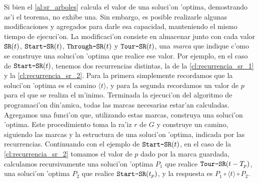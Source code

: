 Si bien el \autoref{al:sr_arboles} calcula el valor de una soluci'on 'optima, demostrando as'i el teorema, no exhibe una. Sin embargo, es posible realizarle algunas modificaciones y agregados para darle esa capacidad, manteniendo el mismo tiempo de ejecuci'on. La modificaci'on consiste en almacenar junto con cada valor $\texttt{SR}(t)$, $\texttt{Start-SR}(t)$, $\texttt{Through-SR}(t)$ y $\texttt{Tour-SR}(t)$, una \textit{marca} que indique c'omo se construye una soluci'on 'optima que realice ese valor. Por ejemplo, en el caso de $\texttt{Start-SR}(t)$, tenemos dos recurrencias distintas, la de la \autoref{cl:recurrencia_sr_1} y la \autoref{cl:recurrencia_sr_2}. Para la primera simplemente recordamos que la soluci'on 'optima es el camino $\langle t \rangle$, y para la segunda recordamos un valor de $p$ para el que se realiza el m'inimo. Terminada la ejecuci'on del algoritmo de programaci'on din'amica, todas las marcas necesarias estar'an calculadas. Agregamos una funci'on que, utilizando estas marcas, construya una soluci'on 'optima. Este procedimiento toma la ra'iz $r$ de $G$ y construye un camino, siguiendo las marcas y la estructura de una soluci'on 'optima, indicada por las recurrencias. Continuando con el ejemplo de $\texttt{Start-SR}(t)$, en el caso de la \autoref{cl:recurrencia_sr_2} tomamos el valor de $p$ dado por la marca guardada, calculamos recursivamente una soluci'on 'optima $P_1$ que realice $\texttt{Tour-SR}(t - T_p)$, una soluci'on 'optima $P_2$ que realice $\texttt{Start-SR}(t_p)$, y la respuesta es $P_1 \circ \langle t \rangle \circ P_2$.
